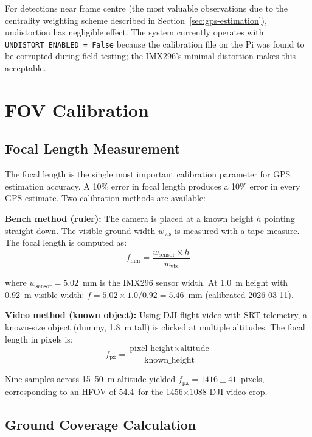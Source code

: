 For detections near frame centre (the most valuable observations due to the centrality
weighting scheme described in Section~\ref{sec:gps-estimation}), undistortion has
negligible effect. The system currently operates with \texttt{UNDISTORT\_ENABLED = False}
because the calibration file on the Pi was found to be corrupted during field testing;
the IMX296's minimal distortion makes this acceptable.


\section{FOV Calibration}
\label{sec:fov-calibration}

\subsection{Focal Length Measurement}

The focal length is the single most important calibration parameter for GPS
estimation accuracy. A 10\% error in focal length produces a 10\% error in every
GPS estimate. Two calibration methods are available:

\textbf{Bench method (ruler):} The camera is placed at a known height $h$ pointing
straight down. The visible ground width $w_\text{vis}$ is measured with a tape measure.
The focal length is computed as:
\begin{equation}
    f_\text{mm} = \frac{w_\text{sensor} \times h}{w_\text{vis}}
    \label{eq:focal-length}
\end{equation}

\noindent where $w_\text{sensor} = 5.02$~mm is the IMX296 sensor width. At 1.0~m
height with 0.92~m visible width: $f = 5.02 \times 1.0 / 0.92 = 5.46$~mm (calibrated
2026-03-11).

\textbf{Video method (known object):} Using DJI flight video with SRT telemetry,
a known-size object (dummy, 1.8~m tall) is clicked at multiple altitudes. The
focal length in pixels is:
\begin{equation}
    f_\text{px} = \frac{\text{pixel\_height} \times \text{altitude}}
    {\text{known\_height}}
    \label{eq:focal-px}
\end{equation}

Nine samples across 15--50~m altitude yielded $f_\text{px} = 1416 \pm 41$~pixels,
corresponding to an HFOV of 54.4\textdegree\ for the 1456$\times$1088 DJI video crop.

\subsection{Ground Coverage Calculation}

